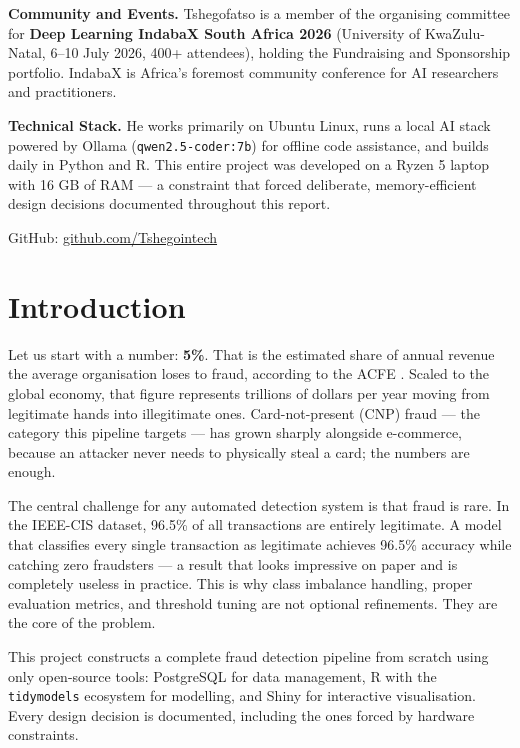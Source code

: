 \documentclass[12pt, a4paper]{article}
\begin{document}
\medskip
\noindent\textbf{Community and Events.}
Tshegofatso is a member of the organising committee for \textbf{Deep Learning
IndabaX South Africa 2026} (University of KwaZulu-Natal, 6--10 July 2026, 400+
attendees), holding the Fundraising and Sponsorship portfolio. IndabaX is Africa's
foremost community conference for AI researchers and practitioners.

\medskip
\noindent\textbf{Technical Stack.}
He works primarily on Ubuntu Linux, runs a local AI stack powered by Ollama
(\texttt{qwen2.5-coder:7b}) for offline code assistance, and builds daily in Python
and R. This entire project was developed on a Ryzen 5 laptop with 16 GB of RAM ---
a constraint that forced deliberate, memory-efficient design decisions documented
throughout this report.

\medskip
\noindent GitHub: \href{https://github.com/Tshegointech}{github.com/Tshegointech}

\newpage
\tableofcontents
\newpage

\section{Introduction}

Let us start with a number: \textbf{5\%}. That is the estimated share of annual
revenue the average organisation loses to fraud, according to the ACFE
\cite{acfe2022}. Scaled to the global economy, that figure represents trillions of
dollars per year moving from legitimate hands into illegitimate ones. Card-not-present
(CNP) fraud --- the category this pipeline targets --- has grown sharply alongside
e-commerce, because an attacker never needs to physically steal a card; the numbers
are enough.

The central challenge for any automated detection system is that fraud is rare.
In the IEEE-CIS dataset, 96.5\% of all transactions are entirely legitimate. A model
that classifies every single transaction as legitimate achieves 96.5\% accuracy while
catching zero fraudsters --- a result that looks impressive on paper and is
completely useless in practice. This is why class imbalance handling, proper
evaluation metrics, and threshold tuning are not optional refinements. They are the
core of the problem.

This project constructs a complete fraud detection pipeline from scratch using only
open-source tools: PostgreSQL for data management, R with the \texttt{tidymodels}
ecosystem for modelling, and Shiny for interactive visualisation. Every design
decision is documented, including the ones forced by hardware constraints.
\end{document}
